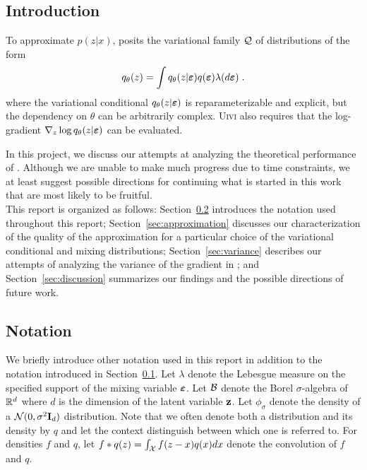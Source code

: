 \documentclass[10pt]{article}
\begin{document}
\subsection{Introduction} \label{sec:introduction}

\todo

To approximate $p(z|x)$, \uivi posits the variational family $\mathcal{Q}$ of distributions of the form
\[
q_\theta(z) = \int q_\theta(z|\bm{\varepsilon})q(\bm{\varepsilon})\lambda(d\bm{\varepsilon}) \;.
\]
where the variational conditional $q_\theta(z|\bm{\varepsilon})$ is reparameterizable and explicit, but the dependency on $\theta$ can be arbitrarily complex. \textsc{Uivi} also requires that the log-gradient $\nabla_z\log q_\theta(z|\bm{\varepsilon})$ can be evaluated.
\todo \elbo

In this project, we discuss our attempts at analyzing the theoretical performance of \uivi. Although we are unable to make much progress due to time constraints, we at least suggest possible directions for continuing what is started in this work that are most likely to be fruitful.
\\

This report is organized as follows: Section~\ref{sec:notation} introduces the notation used throughout this report; Section~\ref{sec:approximation} discusses our characterization of the quality of the \uivi approximation for a particular choice of the variational conditional and mixing distributions; Section~\ref{sec:variance} describes our attempts of analyzing the variance of the \elbo gradient in \uivi; and Section~\ref{sec:discussion} summarizes our findings and the possible directions of future work.


\subsection{Notation} \label{sec:notation}

We briefly introduce other notation used in this report in addition to the notation introduced in Section~\ref{sec:introduction}. Let $\lambda$ denote the Lebesgue measure on the specified support of the mixing variable $\bm{\varepsilon}$. Let $\mathcal{B}$ denote the Borel $\sigma$-algebra of $\mathbb{R}^d$ where $d$ is the dimension of the latent variable $\mathbf{z}$. Let $\phi_\sigma$ denote the density of a $\mathcal{N}(0,\sigma^2\mathbf{I}_d)$ distribution. Note that we often denote both a distribution and its density by $q$ and let the context distinguish between which one is referred to. For densities $f$ and $q$, let $f*q(z)=\int_{\mathcal{X}} f(z-x)q(x)dx$ denote the convolution of $f$ and $q$.
\end{document}
